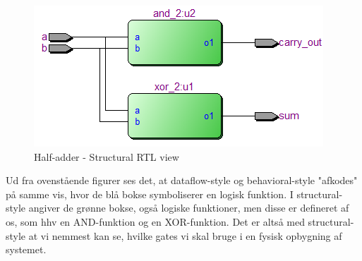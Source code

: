 \begin{enumerate}
\begin{figure}[h]
	\centering
	\includegraphics[scale=0.8]{pictures/Oevelse1/Half_adder/Structural.JPG}
	\caption{Half-adder - Structural RTL view}
	\label{fig:HaStructuralRTL}
\end{figure}
	\newpage
	
	Ud fra ovenstående figurer ses det, at dataflow-style og behavioral-style "afkodes" på samme vis, hvor de blå bokse symboliserer en logisk funktion. I structural-style angiver de grønne bokse, også logiske funktioner, men disse er defineret af os, som hhv en AND-funktion og en XOR-funktion. Det er altså med structural-style at vi nemmest kan se, hvilke gates vi skal bruge i en fysisk opbygning af systemet.\\


\end{enumerate}
